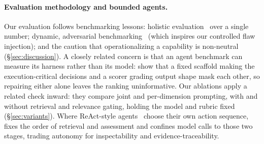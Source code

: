 \paragraph{Evaluation methodology and bounded agents.}
Our evaluation follows benchmarking lessons: holistic
evaluation~\cite{liang2023helm} over a single number; dynamic, adversarial
benchmarking~\cite{kiela2021dynabench} (which inspires our controlled flaw injection);
and the caution that operationalizing a capability is
non-neutral~\cite{raji2021benchmark,jacobs2021measurement}
(\S\ref{sec:discussion}). A closely related concern is that an agent
benchmark can measure its harness rather than its model:
\citet{dmconfound} show that a fixed scaffold making the execution-critical
decisions and a scorer grading output shape mask each other, so repairing
either alone leaves the ranking uninformative. Our ablations apply a
related check inward: they compare joint and per-dimension prompting, with and
without retrieval and relevance gating, holding the model and rubric fixed
(\S\ref{sec:variants}). Where ReAct-style agents~\cite{yao2023react} choose
their own action sequence, \sys{} fixes the order of retrieval and assessment
and confines model calls to those two stages, trading autonomy for
inspectability and evidence-traceability.
